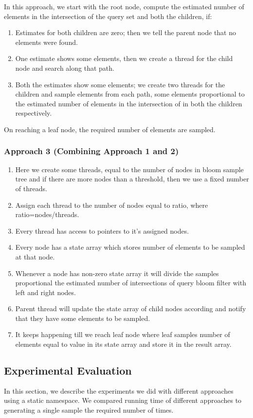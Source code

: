 \documentclass[a4paper]{article}
\begin{document}
In this approach, we start with the root node, compute the estimated number of elements in the intersection of the query set and both the children, if:
\renewcommand{\theenumi}{\alph{enumi}}
\begin{enumerate}
   \item Estimates for both children are zero; then we tell the parent node that no elements were found.
   \item One estimate shows some elements, then we create a thread for the child node and search along that path.
   \item Both the estimates show some elements; we create two threads for the children and sample elements from each path, some elements proportional to the estimated number of elements in the intersection of in both the children respectively.
   \end{enumerate}
On reaching a leaf node, the required number of elements are sampled.


\subsubsection{Approach 3 (Combining Approach 1 and 2)}
\renewcommand{\theenumi}{\arabic{enumi}}
\begin{enumerate}
\item    Here we create some threads, equal to the number of nodes in bloom sample tree and if there are more nodes than a threshold, then we use a fixed number of threads.
\item  Assign each thread to the number of nodes equal to ratio, where ratio=nodes/threads.
\item    Every thread has access to pointers to it's assigned nodes.
\item    Every node has a state array which stores number of elements to be sampled at that node.
\item    Whenever a node has non-zero state array it will divide the samples proportional the estimated number of intersections of query bloom filter with left and right nodes.
\item    Parent thread will update the state array of child nodes according and notify that they have some elements to be sampled.
\item    It keeps happening till we reach leaf node where leaf samples number of elements equal to value in its state array and store it in the result array.
\end{enumerate}


\subsection{Experimental Evaluation}
In this section, we describe the experiments we did with different approaches using a static namespace. We compared running time of different approaches to generating a single sample the required number of times.
\end{document}
